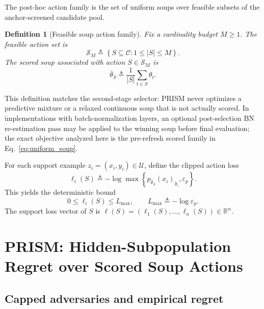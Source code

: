 \documentclass{article}
\newtheorem{definition}{Definition}
\newcommand{\RR}{\mathbb{R}}
\newcommand{\cC}{\mathcal{C}}
\newcommand{\cS}{\mathcal{S}}
\newcommand{\cU}{\mathcal{U}}
\newcommand{\prism}{\textup{\textsc{PRISM}}}
\newcommand{\braces}[1]{\left\{ #1 \right\}}
\newcommand{\paren}[1]{\left( #1 \right)}
\newcommand{\loss}{\ell}
\newcommand{\1}{\mathbbm{1}}
\begin{document}
The post-hoc action family is the set of uniform soups over feasible subsets of the anchor-screened candidate pool.
\begin{definition}[Feasible soup action family]
Fix a cardinality budget \(M\ge 1\). The feasible action set is
\begin{equation}
    \cS_M
    \triangleq
    \braces{
        S \subseteq \cC : 1 \le |S| \le M
    }.
    \label{eq:action_set}
\end{equation}
The scored soup associated with action \(S\in\cS_M\) is
\begin{equation}
    \bar{\theta}_S
    \triangleq
    \frac{1}{|S|} \sum_{t\in S} \theta_t.
    \label{eq:uniform_soup}
\end{equation}
\end{definition}

This definition matches the second-stage selector: \prism{} never optimizes a predictive mixture or a relaxed continuous soup that is not actually scored. In implementations with batch-normalization layers, an optional post-selection BN re-estimation pass may be applied to the winning soup before final evaluation; the exact objective analyzed here is the pre-refresh scored family in Eq.~\eqref{eq:uniform_soup}.

For each support example \(z_i=(x_i,y_i)\in \cU\), define the clipped action loss
\begin{equation}
    \loss_i(S)
    \triangleq
    -\log \max\braces{p_{\bar{\theta}_S}(x_i)_{y_i}, \varepsilon_p}.
    \label{eq:empirical_action_loss}
\end{equation}
This yields the deterministic bound
\begin{equation}
    0 \le \loss_i(S) \le L_{\max},
    \qquad
    L_{\max} \triangleq -\log \varepsilon_p.
    \label{eq:lmax}
\end{equation}
The support loss vector of \(S\) is
\(
    \loss(S) = \paren{\loss_1(S),\ldots,\loss_n(S)} \in \RR^n.
\)

\section{\prism{}: Hidden-Subpopulation Regret over Scored Soup Actions}
\label{sec:method}

\subsection{Capped adversaries and empirical regret}
\end{document}
